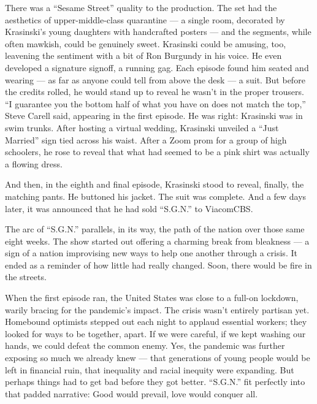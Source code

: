 There was a ``Sesame Street'' quality to the production. The set had the
aesthetics of upper-middle-class quarantine --- a single room, decorated
by Krasinski's young daughters with handcrafted posters --- and the
segments, while often mawkish, could be genuinely sweet. Krasinski could
be amusing, too, leavening the sentiment with a bit of Ron Burgundy in
his voice. He even developed a signature signoff, a running gag. Each
episode found him seated and wearing --- as far as anyone could tell
from above the desk --- a suit. But before the credits rolled, he would
stand up to reveal he wasn't in the proper trousers. ``I guarantee you
the bottom half of what you have on does not match the top,'' Steve
Carell said, appearing in the first episode. He was right: Krasinski was
in swim trunks. After hosting a virtual wedding, Krasinski unveiled a
``Just Married'' sign tied across his waist. After a Zoom prom for a
group of high schoolers, he rose to reveal that what had seemed to be a
pink shirt was actually a flowing dress.

And then, in the eighth and final episode, Krasinski stood to reveal,
finally, the matching pants. He buttoned his jacket. The suit was
complete. And a few days later, it was announced that he had sold
``S.G.N.'' to ViacomCBS.

The arc of ``S.G.N.'' parallels, in its way, the path of the nation over
those same eight weeks. The show started out offering a charming break
from bleakness --- a sign of a nation improvising new ways to help one
another through a crisis. It ended as a reminder of how little had
really changed. Soon, there would be fire in the streets.

When the first episode ran, the United States was close to a full-on
lockdown, warily bracing for the pandemic's impact. The crisis wasn't
entirely partisan yet. Homebound optimists stepped out each night to
applaud essential workers; they looked for ways to be together, apart.
If we were careful, if we kept washing our hands, we could defeat the
common enemy. Yes, the pandemic was further exposing so much we already
knew --- that generations of young people would be left in financial
ruin, that inequality and racial inequity were expanding. But perhaps
things had to get bad before they got better. ``S.G.N.'' fit perfectly
into that padded narrative: Good would prevail, love would conquer all.

